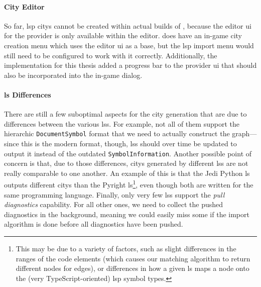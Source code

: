 \documentclass[../thesis]{subfiles}
\begin{document}
\paragraph{City Editor}
So far, \gls{lsp} \glspl{city} cannot be created within actual builds of \SEE{}, because the editor \gls{ui} for the \gls{provider} is only available within the \gls{editor}.
\SEE{} does have an in-game \gls{city} creation menu which uses the editor \gls{ui} as a base, but the \gls{lsp} import menu would still need to be configured to work with it correctly.
Additionally, the implementation for this thesis added a progress bar to the \gls{provider} \gls{ui} that should also be incorporated into the in-game dialog.

\paragraph{\Gls{ls} Differences}
There are still a few suboptimal aspects for the \gls{city} generation that are due to differences between the various \glspl{ls}.
For example, not all of them support the hierarchic \texttt{DocumentSymbol} format that we need to actually construct the graph---since this is the modern format, though, \glspl{ls} should over time be updated to output it instead of the outdated \texttt{SymbolInformation}.
Another possible point of concern is that, due to those differences, \glspl{city} generated by different \glspl{ls} are not really comparable to one another.
An example of this is that the Jedi Python \gls{ls} outputs different \glspl{city} than the Pyright \gls{ls}\footnote{
	This may be due to a variety of factors, such as slight differences in the \glspl{range} of the code elements (which causes our matching algorithm to return different nodes for edges), or differences in how a given \gls{ls} maps a node onto the (very TypeScript-oriented) \gls{lsp} symbol types.
}, even though both are written for the same programming language.
Finally, only very few \glspl{ls} support the \emph{pull diagnostics} \gls{capability}.
For all other ones, we need to collect the pushed diagnostics in the background, meaning we could easily miss some if the import algorithm is done before all diagnostics have been pushed.
\end{document}
